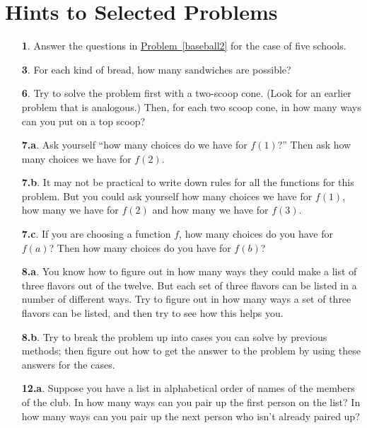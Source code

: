 \documentclass[10pt,]{book}
\theoremstyle{plain}
\theoremstyle{definition}
\theoremstyle{definition}
\numberwithin{equation}{chapter}
\begin{document}
\chapter[{Hints to Selected Problems}]{Hints to Selected Problems}\label{appendix-4}
\begin{itemize}[itemsep=1em]
\item[\textbf{1}.]Answer the questions in \hyperref[baseball2]{Problem~\ref{baseball2}} for the case of five schools.%

\item[\textbf{3}.]For each kind of bread, how many sandwiches are possible?%

\item[\textbf{6}.]Try to solve the problem first with a two-scoop cone. (Look for an earlier problem that is analogous.) Then, for each two scoop cone, in how many ways can you put on a top scoop?%

\item[\textbf{7.a}.]Ask yourself ``how many choices do we have for \(f(1)\)?'' Then ask how many choices we have for \(f(2)\).%

\item[\textbf{7.b}.]It may not be practical to write down rules for all the functions for this problem. But you could ask yourself how many choices we have for \(f(1)\), how many we have for \(f(2)\) and how many we have for \(f(3)\).%

\item[\textbf{7.c}.]If you are choosing a function \(f\), how many choices do you have for \(f(a)\)? Then how many choices do you have for \(f(b)\)?%

\item[\textbf{8.a}.]You know how to figure out in how many ways they could make a list of three flavors out of the twelve. But each set of three flavors can be listed in a number of different ways. Try to figure out in how many ways a set of three flavors can be listed, and then try to see how this helps you.%

\item[\textbf{8.b}.]Try to break the problem up into cases you can solve by previous methods; then figure out how to get the answer to the problem by using these answers for the cases.%

\item[\textbf{12.a}.]Suppose you have a list in alphabetical order of names of the members of the club. In how many ways can you pair up the first person on the list? In how many ways can you pair up the next person who isn't already paired up?%


\end{itemize}
\end{document}
